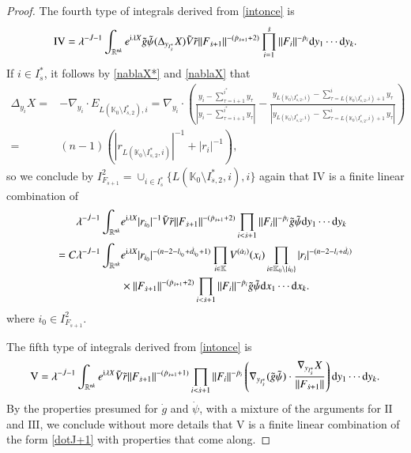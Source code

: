 \documentclass[11pt,reqno]{amsart}
\def\d{{\rm d}}
\numberwithin{equation}{section}
\theoremstyle{definition}
\begin{document}
\begin{proof}
	The fourth type of integrals derived from \eqref{intonce} is
	\begin{equation*}
		\mathrm{IV}=\lambda^{-\dot{J}-1}\int_{\mathbb{R}^{nk}}e^{\mathrm{i}\lambda X}\tilde{g}\tilde{\psi}(\Delta_{y_{I_{\dot{s}}^*}}X)\tilde{V}\tilde{r}\|F_{\dot{s}+1}\|^{-(\dot{p}_{\dot{s}+1}+2)}\prod_{i=1}^{\dot{s}}\|F_i\|^{-{\dot{p}_i}}\d y_1\cdots \d y_k.
	\end{equation*}
	If $i\in I_{\dot{s}}^*$, it follows by \eqref{nablaX*} and \eqref{nablaX} that
	\begin{equation*}
		\begin{split}
			\Delta_{y_i}X=&-\nabla_{y_i}\cdot E_{L(\mathbb{K}_0\setminus I_{\dot{s},2}^*),i}=\nabla_{y_i}\cdot\left(\frac{\mbox{$y_i-\sum_{\tau=i+1}^{i^*}y_\tau$}}{|\mbox{$y_i-\sum_{\tau=i+1}^{i^*}y_\tau$}|}-\frac{y_{L(\mathbb{K}_0\setminus I_{\dot{s},2}^*,i)}-\mbox{$\sum_{\tau=L(\mathbb{K}_0\setminus I_{\dot{s},2}^*,i)+1}^{i}y_\tau$}}{|y_{L(\mathbb{K}_0\setminus I_{\dot{s},2}^*,i)}-\mbox{$\sum_{\tau=L(\mathbb{K}_0\setminus I_{\dot{s},2}^*,i)+1}^{i}y_\tau$}|}\right)\\
			=&(n-1)\left(|r_{L(\mathbb{K}_0\setminus I_{\dot{s},2}^*,i)}|^{-1}+|r_i|^{-1}\right),
		\end{split}
	\end{equation*}
	so we conclude by $I_{F_{\dot{s}+1}}^2=\cup_{i\in I_{\dot{s}}^*}\{L(\mathbb{K}_0\setminus I_{\dot{s},2}^*,i),i\}$ again that $\mathrm{IV}$ is a finite linear combination of
	\begin{equation}\label{IVcom}
		\begin{split}
			\lambda^{-\dot{J}-1}\int_{\mathbb{R}^{nk}}&e^{\mathrm{i}\lambda X}|r_{i_0}|^{-1}\tilde{V}\tilde{r}\|F_{\dot{s}+1}\|^{-(\dot{p}_{\dot{s}+1}+2)}\prod_{i<\dot{s}+1}\|F_i\|^{-{\dot{p}_i}}\tilde{g}\tilde{\psi} \d y_1\cdots \d y_k\\
			=C\lambda^{-\dot{J}-1}\int_{\mathbb{R}^{nk}}&e^{\mathrm{i}\lambda X}|r_{i_0}|^{-(n-2-l_{i_0}+\dot{d}_{i_0}+1)}\prod_{i\in\mathbb{K}}V^{(\dot{\alpha}_i)}(x_i)\prod_{i\in\mathbb{K}_0\setminus\{i_0\}}|r_i|^{-(n-2-l_i+\dot{d}_i)}\\
			&\times\|F_{\dot{s}+1}\|^{-(\dot{p}_{\dot{s}+1}+2)}\prod_{i<\dot{s}+1}\|F_i\|^{-{\dot{p}_i}}\tilde{g}\tilde{\psi} \d x_1\cdots \d x_k.
		\end{split}
	\end{equation}
	where $i_0\in I_{F_{\dot{s}+1}}^2$.
	
	The fifth type of integrals derived from \eqref{intonce} is
	\begin{equation*}
		\mathrm{V}=\lambda^{-\dot{J}-1}\int_{\mathbb{R}^{nk}}e^{\mathrm{i}\lambda X}\tilde{V}\tilde{r}\|F_{\dot{s}+1}\|^{-(\dot{p}_{\dot{s}+1}+1)}\prod_{i<\dot{s}+1}\|F_i\|^{-{\dot{p}_i}}\left(\nabla_{y_{I_{\dot{s}}^*}}(\tilde{g}\tilde{\psi})\cdot\frac{\nabla_{y_{I_{\dot{s}}^*}}X}{\|F_{\dot{s}+1}\|}\right)\d y_1\cdots \d y_k.
	\end{equation*}
	By the properties presumed for $\dot{g}$ and $\dot{\psi}$, with a mixture of the arguments for $\mathrm{II}$ and $\mathrm{III}$, we conclude without more details that $\mathrm{V}$ is a finite linear combination of the form \eqref{dotJ+1} with properties that come along.
	

\end{proof}
\end{document}
